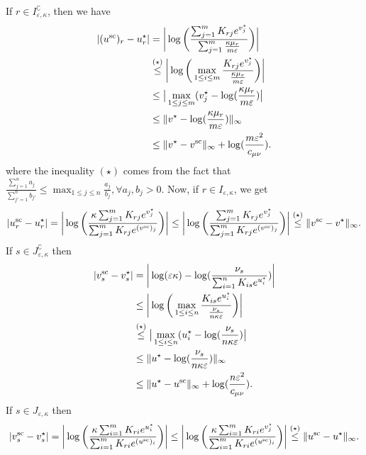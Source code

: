 If $r \in I^\complement_{\varepsilon, \kappa}$, then we have 
\begin{align*}
|({u}^{\text{sc}})_{r} - {u}^\star_r| 
&= \bigg|\log\bigg(\frac{\sum_{j=1}^m K_{rj}e^{v^\star_j}}{\sum_{j=1}^m \frac{\kappa \mu_r}{m\varepsilon}}\bigg) \bigg|\\
& \overset{(\star)}{\leq} \bigg|\log\bigg(\max_{1\leq i \leq m} \frac{K_{rj}e^{v^\star_j}}{\frac{\kappa \mu_r}{m\varepsilon}}\bigg) \bigg|\\
& \leq \big|\max_{1\leq j \leq m} (v_j^\star - \log(\frac{\kappa \mu_r}{m\varepsilon})\big|\\
& \leq \|v^\star - \log(\frac{\kappa \mu_r}{m\varepsilon})\|_\infty \\
& \leq \|v^\star - {v}^{\text{sc}}\|_\infty + \log(\frac{m\varepsilon^2}{c_{\mu\nu}}).
\end{align*}
where the inequality $(\star)$ comes from the fact that $\frac{\sum_{j=1}^na_j}{\sum_{j'=1}^nb_{j'}} \leq \max_{1\leq j \leq n} \frac{a_j}{b_j}, \forall a_j, b_j>0.$
Now, if $r \in I_{\varepsilon, \kappa}$, we get 
\begin{align*}
|{u}^{\text{sc}}_{r} - {u}^\star_r|
= \bigg|\log\bigg(\frac{\kappa\sum_{j=1}^m K_{rj}e^{v^\star_j}}{\sum_{j=1}^m K_{rj}e^{(v^{\text{sc}})_j}}\bigg)\bigg|
\leq \bigg|\log\bigg(\frac{\sum_{j=1}^m K_{rj}e^{v^\star_j}}{\sum_{j=1}^m K_{rj}e^{(v^{\text{sc}})_j}}\bigg)\bigg|
\overset{(\star)}{\leq}\|v^{\text{sc}} - v^\star\|_\infty.
\end{align*}
If $s \in J^\complement_{\varepsilon, \kappa}$ then 
\begin{align*}
|{v}^{\text{sc}}_{s} - {v}^\star_s| &= \bigg| \log(\varepsilon\kappa) - \log(\frac{\nu_s}{\sum_{i=1}^n K_{is}e^{u^\star_i}})\bigg|\\
& \leq \bigg|\log\bigg(\max_{1\leq i \leq n} \frac{K_{is}e^{u^\star_i}}{\frac{\nu_s}{n\kappa\varepsilon}}\bigg) \bigg|\\
& \overset{(\star)}{\leq} \big|\max_{1\leq i \leq n} (u_i^\star - \log(\frac{\nu_s}{n\kappa\varepsilon})\big|\\
& \leq \|u^\star - \log(\frac{\nu_s}{n\kappa\varepsilon})\|_\infty \\
& \leq \|u^\star - u^{\text{sc}}\|_\infty +  \log(\frac{n\varepsilon^2}{c_{\mu\nu}}).
\end{align*}
If $s \in J_{\varepsilon, \kappa}$ then 
\begin{align*}
|{v}^{\text{sc}}_{s} - {v}^\star_s| 
= \bigg|\log\bigg(\frac{\kappa\sum_{i=1}^m K_{ri}e^{u^\star_i}}{\sum_{i=1}^m K_{ri}e^{(u^{\text{sc}})_i}}\bigg)\bigg|
 \leq \bigg|\log\bigg(\frac{\kappa\sum_{i=1}^m K_{ri}e^{v^\star_j}}{\sum_{i=1}^m K_{ri}e^{(u^{\text{sc}})_i}}\bigg)\bigg|
\overset{(\star)}{\leq} \|u^{\text{sc}} - u^\star\|_\infty.
\end{align*}

